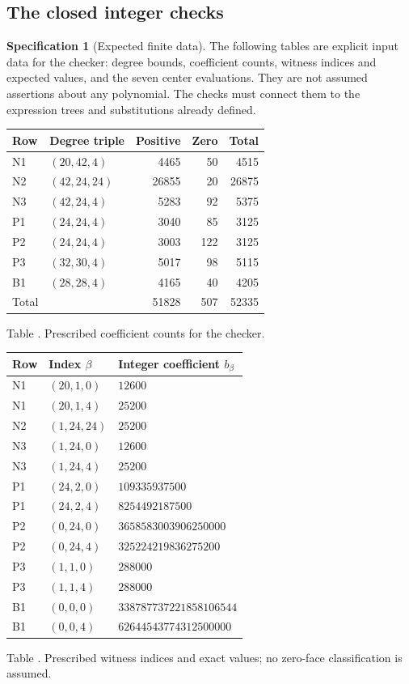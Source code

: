 \documentclass[11pt,a4paper]{article}
\theoremstyle{definition}
\newtheorem{specification}{Specification}[section]
\begin{document}
\subsection{The closed integer checks}
\begin{specification}[Expected finite data]\label{spec:expected-data}
The following tables are explicit input data for the checker: degree bounds, coefficient counts, witness indices and expected values, and the seven center evaluations. They are not assumed assertions about any polynomial. The checks must connect them to the expression trees and substitutions already defined.
\begin{center}
\begin{tabular}{@{}llrrr@{}}
\toprule
Row & Degree triple & Positive & Zero & Total\\
\midrule
N1 & $(20,42,4)$ & 4465 & 50 & 4515\\
N2 & $(42,24,24)$ & 26855 & 20 & 26875\\
N3 & $(42,24,4)$ & 5283 & 92 & 5375\\
P1 & $(24,24,4)$ & 3040 & 85 & 3125\\
P2 & $(24,24,4)$ & 3003 & 122 & 3125\\
P3 & $(32,30,4)$ & 5017 & 98 & 5115\\
B1 & $(28,28,4)$ & 4165 & 40 & 4205\\
\midrule
Total && 51828 & 507 & 52335\\
\bottomrule
\end{tabular}
\label{tab:counts}\par\smallskip
\small Table \thetable. Prescribed coefficient counts for the checker.
\end{center}

\begin{center}
\begin{tabular}{@{}lll@{}}
\toprule
Row & Index $\beta$ & Integer coefficient $b_\beta$\\
\midrule
N1 & $(20,1,0)$ & $12600$\\
N1 & $(20,1,4)$ & $25200$\\
N2 & $(1,24,24)$ & $25200$\\
N3 & $(1,24,0)$ & $12600$\\
N3 & $(1,24,4)$ & $25200$\\
P1 & $(24,2,0)$ & $109335937500$\\
P1 & $(24,2,4)$ & $8254492187500$\\
P2 & $(0,24,0)$ & $3658583003906250000$\\
P2 & $(0,24,4)$ & $325224219836275200$\\
P3 & $(1,1,0)$ & $288000$\\
P3 & $(1,1,4)$ & $288000$\\
B1 & $(0,0,0)$ & $338787737221858106544$\\
B1 & $(0,0,4)$ & $62644543774312500000$\\
\bottomrule
\end{tabular}
\label{tab:witnesses}\par\smallskip
\small Table \thetable. Prescribed witness indices and exact values; no zero-face classification is assumed.
\end{center}


\end{specification}
\end{document}
